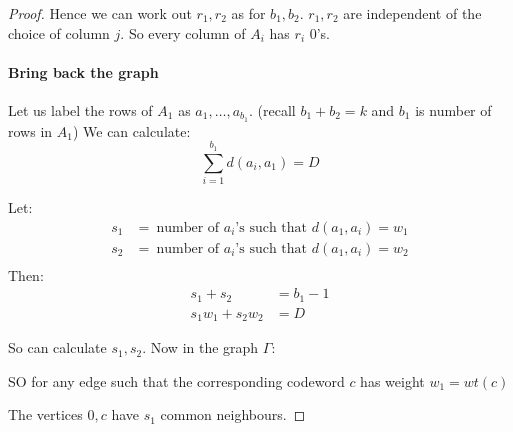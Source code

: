 \documentclass[]{article}
\theoremstyle{definition}
\theoremstyle{remark}
\numberwithin{equation}{section}
\begin{document}
\begin{proof}
				Hence we can work out $r_1, r_2$ as for $b_1, b_2$. $r_1, r_2$ are independent of the choice of column $j$. So every column of $A_i$ has $r_i$ 0's. 

			\paragraph*{Bring back the graph}
				Let us label the rows of $A_1$ as $a_1, \hdots, a_{b_1}$. (recall $b_1 + b_2 = k$ and $b_1$ is number of rows in $A_1$) We can calculate:
				\[
					\sum_{i=1}^{b_1} d(a_i, a_1) = D
				\]

				Let:
				\begin{align*}
					s_1 &=\ \text{number of $a_i$'s such that $d(a_1, a_i) = w_1$}\\
					s_2 &=\ \text{number of $a_i$'s such that $d(a_1, a_i) = w_2$}\\
				\end{align*}
				Then:
				\begin{align*}
					s_1 + s_2 &= b_1 -1 \\
					s_1 w_1 + s_2 w_2 &= D
				\end{align*}

				So can calculate $s_1, s_2$.
				Now in the graph $\Gamma:$
					\begin{figure}[H]
						\centering
					\end{figure}
				SO for any edge such that the corresponding codeword $c$ has weight $w_1 = wt(c)$

					\begin{figure}[H]
						\centering
					\end{figure}
				The vertices $0, c$ have $s_1$ common neighbours.


\end{proof}
\end{document}
